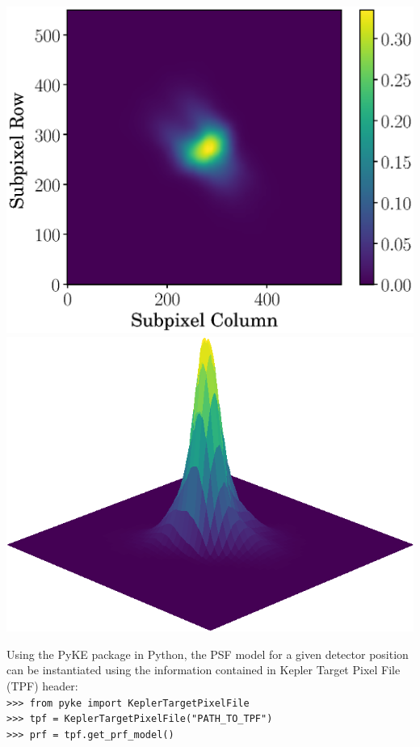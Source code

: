 \documentclass[landscape,a0b,final]{a0poster}
\newenvironment{poster}{
  \begin{center}
  \begin{minipage}[c]{0.98\textwidth}
}{
  \end{minipage}
  \end{center}
}
\newenvironment{pcolumn}[1]{
  \begin{minipage}{#1\textwidth}
  \begin{center}
}{
  \end{center}
  \end{minipage}
}
\begin{document}
\begin{poster}
\begin{center}
\begin{pcolumn}{0.32}
{\begin{center}
        \includegraphics[width=15cm,angle=0]{figs/prf.eps}
        \includegraphics[width=16.5cm,angle=0]{figs/prf-deg-45.eps}

    \end{center}
            Using the PyKE package in Python, the PSF model for a given detector position can be instantiated using the information
            contained in Kepler Target Pixel File (TPF) header:\\
        \texttt{>>> from pyke import KeplerTargetPixelFile} \\
        \texttt{>>> tpf = KeplerTargetPixelFile("PATH\_TO\_TPF")}\\
        \texttt{>>> prf = tpf.get\_prf\_model()}

}
\end{pcolumn}
\end{center}
\end{poster}
\end{document}
